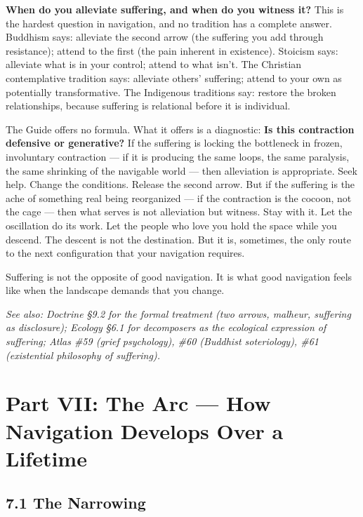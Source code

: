 \textbf{When do you alleviate suffering, and when do you witness it?} This is the hardest question in navigation, and no tradition has a complete answer. Buddhism says: alleviate the second arrow (the suffering you add through resistance); attend to the first (the pain inherent in existence). Stoicism says: alleviate what is in your control; attend to what isn't. The Christian contemplative tradition says: alleviate others' suffering; attend to your own as potentially transformative. The Indigenous traditions say: restore the broken relationships, because suffering is relational before it is individual.


The Guide offers no formula. What it offers is a diagnostic: \textbf{Is this contraction defensive or generative?} If the suffering is locking the bottleneck in frozen, involuntary contraction — if it is producing the same loops, the same paralysis, the same shrinking of the navigable world — then alleviation is appropriate. Seek help. Change the conditions. Release the second arrow. But if the suffering is the ache of something real being reorganized — if the contraction is the cocoon, not the cage — then what serves is not alleviation but witness. Stay with it. Let the oscillation do its work. Let the people who love you hold the space while you descend. The descent is not the destination. But it is, sometimes, the only route to the next configuration that your navigation requires.


Suffering is not the opposite of good navigation. It is what good navigation feels like when the landscape demands that you change.


\textit{See also: Doctrine §9.2 for the formal treatment (two arrows, malheur, suffering as disclosure); Ecology §6.1 for decomposers as the ecological expression of suffering; Atlas \#59 (grief psychology), \#60 (Buddhist soteriology), \#61 (existential philosophy of suffering).}


\bigskip\noindent\makebox[\textwidth]{\color{rulegray}\rule{5cm}{0.3pt}}\bigskip


\chapter*{Part VII: The Arc — How Navigation Develops Over a Lifetime}


\section*{7.1 The Narrowing}


